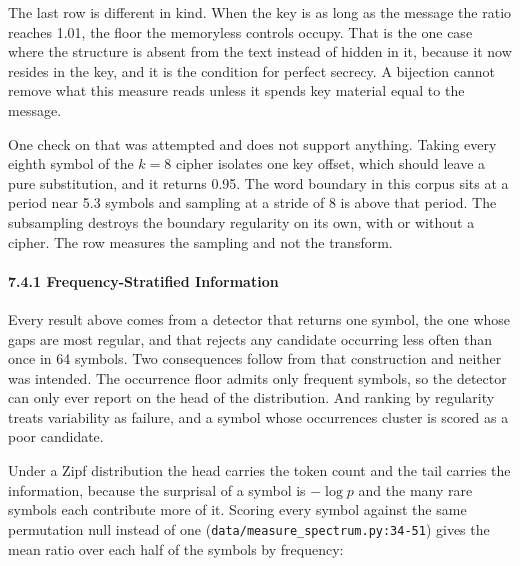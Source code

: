 The last row is different in kind. When the key is as long as the message the ratio reaches 1.01, the floor the memoryless controls occupy. That is the one case where the structure is absent from the text instead of hidden in it, because it now resides in the key, and it is the condition for perfect secrecy. A bijection cannot remove what this measure reads unless it spends key material equal to the message.

One check on that was attempted and does not support anything. Taking every eighth symbol of the \(k = 8\) cipher isolates one key offset, which should leave a pure substitution, and it returns 0.95. The word boundary in this corpus sits at a period near 5.3 symbols and sampling at a stride of 8 is above that period. The subsampling destroys the boundary regularity on its own, with or without a cipher. The row measures the sampling and not the transform.

\paragraph{7.4.1 Frequency-Stratified Information}

Every result above comes from a detector that returns one symbol, the one whose gaps are most regular, and that rejects any candidate occurring less often than once in 64 symbols. Two consequences follow from that construction and neither was intended. The occurrence floor admits only frequent symbols, so the detector can only ever report on the head of the distribution. And ranking by regularity treats variability as failure, and a symbol whose occurrences cluster is scored as a poor candidate.

Under a Zipf distribution the head carries the token count and the tail carries the information, because the surprisal of a symbol is \(-\log p\) and the many rare symbols each contribute more of it. Scoring every symbol against the same permutation null instead of one (\texttt{data/\allowbreak{}measure\_\allowbreak{}spectrum.\allowbreak{}py:34-\allowbreak{}51}) gives the mean ratio over each half of the symbols by frequency:

